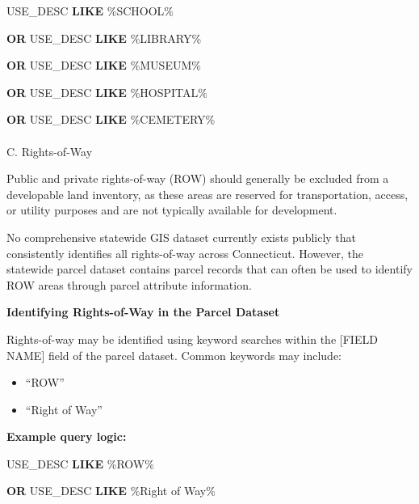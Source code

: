 \documentclass[
  letterpaper,
  DIV=11,
  numbers=noendperiod]{scrreprt}
\makeatletter
\let\oldparagraph\paragraph
\renewcommand{\paragraph}{
    \@ifstar
      \xxxParagraphStar
      \xxxParagraphNoStar
  }
\newcommand{\xxxParagraphStar}[1]{\oldparagraph*{#1}\mbox{}}
\newcommand{\xxxParagraphNoStar}[1]{\oldparagraph{#1}\mbox{}}
\newenvironment{Shaded}{\begin{snugshade}}{\end{snugshade}}
\newcommand{\KeywordTok}[1]{\textcolor[rgb]{0.00,0.23,0.31}{\textbf{#1}}}
\newcommand{\NormalTok}[1]{\textcolor[rgb]{0.00,0.23,0.31}{#1}}
\newcommand{\StringTok}[1]{\textcolor[rgb]{0.13,0.47,0.30}{#1}}
\providecommand{\tightlist}{%
  \setlength{\itemsep}{0pt}\setlength{\parskip}{0pt}}
\makeatother
\begin{document}
\begin{Shaded}
\begin{Highlighting}[]
\NormalTok{USE\_DESC }\KeywordTok{LIKE} \StringTok{\textquotesingle{}\%SCHOOL\%\textquotesingle{}}

\KeywordTok{OR}\NormalTok{ USE\_DESC }\KeywordTok{LIKE} \StringTok{\textquotesingle{}\%LIBRARY\%\textquotesingle{}}

\KeywordTok{OR}\NormalTok{ USE\_DESC }\KeywordTok{LIKE} \StringTok{\textquotesingle{}\%MUSEUM\%\textquotesingle{}}

\KeywordTok{OR}\NormalTok{ USE\_DESC }\KeywordTok{LIKE} \StringTok{\textquotesingle{}\%HOSPITAL\%\textquotesingle{}}

\KeywordTok{OR}\NormalTok{ USE\_DESC }\KeywordTok{LIKE} \StringTok{\textquotesingle{}\%CEMETERY\%\textquotesingle{}}
\end{Highlighting}
\end{Shaded}

\paragraph{C. Rights-of-Way}\label{c.-rights-of-way}

Public and private rights-of-way (ROW) should generally be excluded from
a developable land inventory, as these areas are reserved for
transportation, access, or utility purposes and are not typically
available for development.

No comprehensive statewide GIS dataset currently exists publicly that
consistently identifies all rights-of-way across Connecticut. However,
the statewide parcel dataset contains parcel records that can often be
used to identify ROW areas through parcel attribute information.

\textbf{Identifying Rights-of-Way in the Parcel Dataset}

Rights-of-way may be identified using keyword searches within the
{[}FIELD NAME{]} field of the parcel dataset. Common keywords may
include:

\begin{itemize}
\tightlist
\item
  ``ROW''
\item
  ``Right of Way''
\end{itemize}

\textbf{Example query logic:}

\begin{Shaded}
\begin{Highlighting}[]
\NormalTok{USE\_DESC }\KeywordTok{LIKE} \StringTok{\textquotesingle{}\%ROW\%\textquotesingle{}}

\KeywordTok{OR}\NormalTok{ USE\_DESC }\KeywordTok{LIKE} \StringTok{\textquotesingle{}\%Right of Way\%\textquotesingle{}}
\end{Highlighting}
\end{Shaded}
\end{document}
